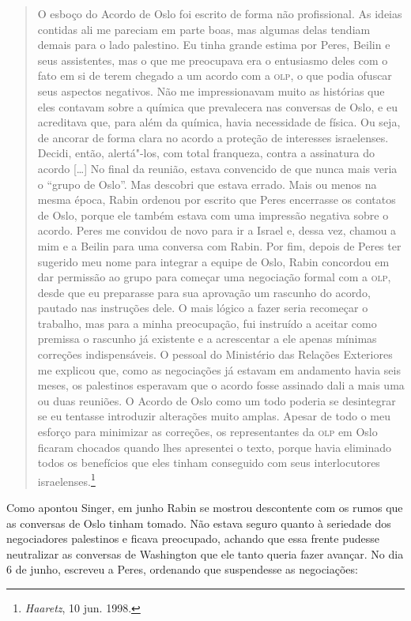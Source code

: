 \begin{quote}
O esboço do Acordo de Oslo foi escrito de forma não profissional. As
ideias contidas ali me pareciam em parte boas, mas algumas delas tendiam
demais para o lado palestino. Eu tinha grande estima por Peres, Beilin e
seus assistentes, mas o que me preocupava era o entusiasmo deles com
o fato em si de terem chegado a um acordo com a \textsc{olp}, o que podia ofuscar seus
aspectos negativos. Não me impressionavam muito as histórias que eles
contavam sobre a química que prevalecera nas conversas de Oslo, e eu
acreditava que, para além da química, havia necessidade de física. Ou
seja, de ancorar de forma clara no acordo a proteção de interesses
israelenses. Decidi, então, alertá"-los, com total franqueza, contra a
assinatura do acordo {[}\ldots{}{]} No final da reunião, estava convencido de que
nunca mais veria o ``grupo de Oslo''. Mas descobri que estava errado.
Mais ou menos na mesma época, Rabin ordenou por escrito que Peres
encerrasse os contatos de Oslo, porque ele também estava com uma
impressão negativa sobre o acordo. Peres me convidou de novo para ir a
Israel e, dessa vez, chamou a mim e a Beilin para uma conversa com
Rabin. Por fim, depois de Peres ter sugerido meu nome para integrar a
equipe de Oslo, Rabin concordou em dar permissão ao grupo para começar
uma negociação formal com a \textsc{olp}, desde que eu preparasse para sua
aprovação um rascunho do acordo, pautado nas instruções dele. O mais
lógico a fazer seria recomeçar o trabalho, mas para a minha preocupação,
fui instruído a aceitar como premissa o rascunho já existente e a
acrescentar a ele apenas mínimas correções indispensáveis. O pessoal do
Ministério das Relações Exteriores me explicou que, como as negociações
já estavam em andamento havia seis meses, os palestinos esperavam que o
acordo fosse assinado dali a mais uma ou duas reuniões. O Acordo de Oslo
como um todo poderia se desintegrar se eu tentasse introduzir alterações
muito amplas. Apesar de todo o meu esforço para minimizar as correções,
os representantes da \textsc{olp} em Oslo ficaram chocados quando lhes apresentei
o texto, porque havia eliminado todos os benefícios que eles tinham
conseguido com seus interlocutores israelenses.\footnote{\textit{Haaretz},
  10 jun. 1998.}
\end{quote}

Como apontou Singer, em junho Rabin se mostrou descontente com os rumos
que as conversas de Oslo tinham tomado. Não estava seguro quanto à
seriedade dos negociadores palestinos e ficava preocupado, achando que
essa frente pudesse neutralizar as conversas de Washington que ele tanto
queria fazer avançar. No dia 6 de junho, escreveu a Peres, ordenando que
suspendesse as negociações:


